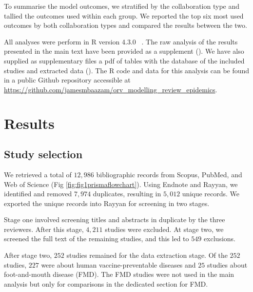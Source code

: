 \documentclass[10pt,letterpaper]{article}
\begin{document}
To summarise the model outcomes, we stratified by the collaboration type and tallied the outcomes used within each group. We reported the top six most used outcomes by both collaboration types and compared the results between the two.

All analyses were perform in R version 4.3.0 ~\cite{R2023}.  The raw analysis of the results presented in the main text have been provided as a supplement (). We have also supplied as supplementary files a pdf of tables with the database of the included studies and extracted data (). The R code and data for this analysis can be found in a public Github repository accessible at \url{https://github.com/jamesmbaazam/orv_modelling_review_epidemics}.

\section*{Results}
\subsection*{Study selection}
We retrieved a total of $12, 986$ bibliographic records from Scopus, PubMed, and Web of Science (Fig \ref{fig:fig1prismaflowchart}). Using Endnote and Rayyan, we identified and removed $7, 974$ duplicates, resulting in $5, 012$ unique records. We exported the unique records into Rayyan for screening in two stages. 

Stage one involved screening titles and abstracts in duplicate by the three reviewers. After this stage, $4, 211$ studies were excluded. At stage two, we screened the full text of the remaining studies, and this led to $549$ exclusions. 

After stage two, $252$ studies remained for the data extraction stage. Of the $252$ studies, $227$ were about human vaccine-preventable diseases and $25$ studies about foot-and-mouth disease (FMD). The FMD studies were not used in the main analysis but only for comparisons in the dedicated section for FMD.
\end{document}

